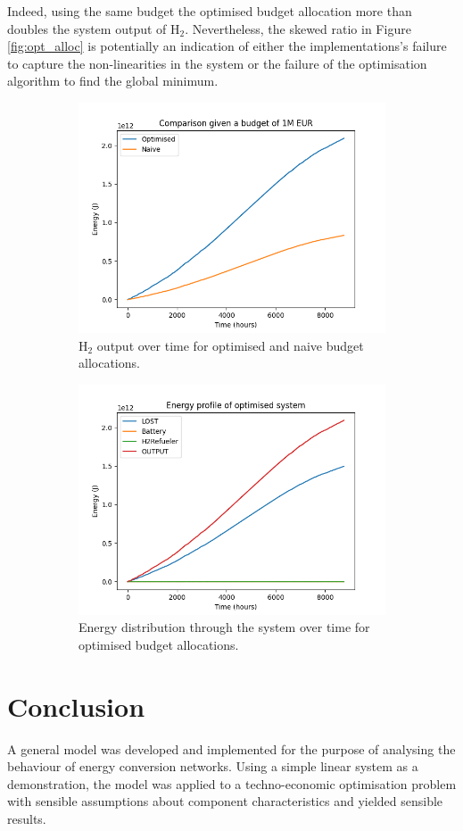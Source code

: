 \documentclass[]{article}
\numberwithin{equation}{section}
\theoremstyle{plain} %
\theoremstyle{definition}
\theoremstyle{remark}
\begin{document}
Indeed, using the same budget the optimised budget allocation more than doubles the system output of $\mathrm{H_2}$.
Nevertheless, the skewed ratio in Figure \ref{fig:opt_alloc} is potentially an
indication of either the implementations's failure to capture the non-linearities in the system
or the failure of the optimisation algorithm to find the global minimum.
\bigbreak

\begin{figure}[htbp]
    \centering
    \begin{subfigure}[h]{\textwidth}
        \centering
        \includegraphics[width=.75\textwidth]{assets/opt_naive_cmp.png}
        \caption{$\mathrm{H_2}$ output over time for optimised and naive budget allocations.}
        \label{fig:opt_naive_cmp}
    \end{subfigure}
    \hfill
    \begin{subfigure}[h]{\textwidth}
        \centering
        \includegraphics[width=.75\textwidth]{assets/opt_budget_profile.png}
        \caption{Energy distribution through the system over time for optimised budget allocations.}
        \label{fig:opt_budget_profile}
    \end{subfigure}
    \caption{}
    \label{fig:opt_perf}
\end{figure}

\newpage
\section{Conclusion}
A general model was developed and implemented for the purpose of
analysing the behaviour of energy conversion networks.
Using a simple linear system as a demonstration, the model was applied to a techno-economic optimisation problem
with sensible assumptions about component characteristics and yielded sensible results.

\end{document}
